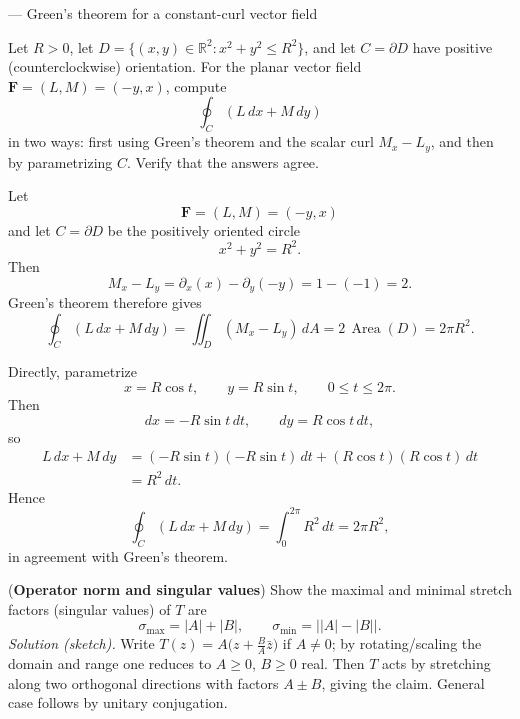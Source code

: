 \begin{problem}[CP-IV-0091]
\label{prob:cp-iv-0091}
— Green's theorem for a constant-curl vector field

Let $R>0$, let $D=\{(x,y)\in\mathbb R^2:x^2+y^2\le R^2\}$,
and let $C=\partial D$ have positive (counterclockwise) orientation.
For the planar vector field $\mathbf F=(L,M)=(-y,x)$, compute
\[
\oint_C (L\,dx+M\,dy)
\]
in two ways: first using Green's theorem and the scalar curl $M_x-L_y$,
and then by parametrizing $C$. Verify that the answers agree.
\end{problem}

\begin{solution}
Let
\[
\mathbf F=(L,M)=(-y,x)
\]
and let \(C=\partial D\) be the positively oriented circle
\[
x^2+y^2=R^2.
\]
Then
\[
M_x-L_y
=
\partial_x(x)-\partial_y(-y)
=
1-(-1)
=
2.
\]
Green's theorem therefore gives
\[
\oint_C(L\,dx+M\,dy)
=
\iint_D(M_x-L_y)\,dA
=
2\,\operatorname{Area}(D)
=
2\pi R^2.
\]

Directly, parametrize
\[
x=R\cos t,\qquad y=R\sin t,\qquad 0\le t\le2\pi.
\]
Then
\[
dx=-R\sin t\,dt,\qquad dy=R\cos t\,dt,
\]
so
\[
\begin{aligned}
L\,dx+M\,dy
&=
(-R\sin t)(-R\sin t)\,dt
+
(R\cos t)(R\cos t)\,dt\\
&=
R^2\,dt.
\end{aligned}
\]
Hence
\[
\oint_C(L\,dx+M\,dy)
=
\int_0^{2\pi}R^2\,dt
=
\boxed{2\pi R^2},
\]
in agreement with Green's theorem.
\end{solution}


\begin{problem}[CP-IV-0093]
\label{prob:cp-iv-0093}
\par\noindent\textbullet\quad (\textbf{Operator norm and singular values})
	Show the maximal and minimal stretch factors (singular values) of $T$ are
	\[
	\sigma_{\max}=|A|+|B|,\qquad \sigma_{\min}=\bigl||A|-|B|\bigr|.
	\]
	\emph{Solution (sketch).} Write $T(z)=A\bigl(z+\tfrac{B}{A}\bar z\bigr)$ if $A\neq0$; by rotating/scaling the domain and range one reduces to $A\ge0$, $B\ge0$ real. Then $T$ acts by stretching along two orthogonal directions with factors $A\pm B$, giving the claim. General case follows by unitary conjugation.
\end{problem}

